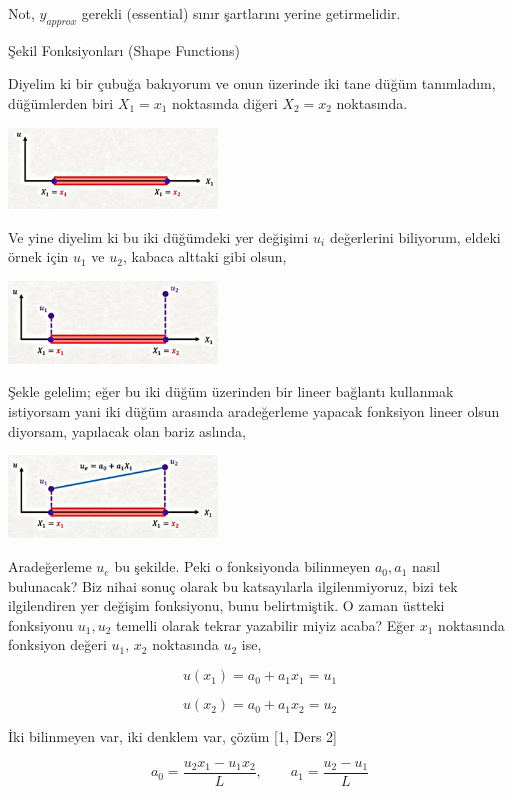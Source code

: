 \documentclass[12pt,fleqn]{article}\usepackage{../../common}
\begin{document}
Not, $y_{approx}$ gerekli (essential) sınır şartlarını yerine getirmelidir.

Şekil Fonksiyonları (Shape Functions)

Diyelim ki bir çubuğa bakıyorum ve onun üzerinde iki tane düğüm tanımladım,
düğümlerden biri $X_1 = x_1$ noktasında diğeri $X_2 = x_2$ noktasında.

\includegraphics[width=15em]{compscieng_bpp45fem2_05.jpg}

Ve yine diyelim ki bu iki düğümdeki yer değişimi $u_i$ değerlerini biliyorum,
eldeki örnek için $u_1$ ve $u_2$, kabaca alttaki gibi olsun,

\includegraphics[width=15em]{compscieng_bpp45fem2_06.jpg}

Şekle gelelim; eğer bu iki düğüm üzerinden bir lineer bağlantı kullanmak
istiyorsam yani iki düğüm arasında aradeğerleme yapacak fonksiyon lineer olsun
diyorsam, yapılacak olan bariz aslında,

\includegraphics[width=15em]{compscieng_bpp45fem2_07.jpg}

Aradeğerleme $u_e$ bu şekilde. Peki o fonksiyonda bilinmeyen $a_0,a_1$ nasıl
bulunacak? Biz nihai sonuç olarak bu katsayılarla ilgilenmiyoruz, bizi tek
ilgilendiren yer değişim fonksiyonu, bunu belirtmiştik. O zaman üstteki
fonksiyonu $u_1,u_2$ temelli olarak tekrar yazabilir miyiz acaba? Eğer $x_1$
noktasında fonksiyon değeri $u_1$, $x_2$ noktasında $u_2$ ise,

$$
u(x_1) = a_0 + a_1 x_1 = u_1
$$

$$
u(x_2) = a_0 + a_1 x_2 = u_2
$$

İki bilinmeyen var, iki denklem var, çözüm [1, Ders 2]

$$
a_0 = \frac{u_2 x_1 - u_1 x_2}{L}, \qquad a_1 = \frac{u_2 - u_1}{L}
$$
\end{document}
